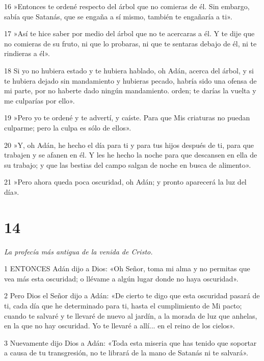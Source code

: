 \par 16 »Entonces te ordené respecto del árbol que no comieras de él. Sin embargo, sabía que Satanás, que se engaña a sí mismo, también te engañaría a ti».

\par 17 »Así te hice saber por medio del árbol que no te acercaras a él. Y te dije que no comieras de su fruto, ni que lo probaras, ni que te sentaras debajo de él, ni te rindieras a él».

\par 18 Si yo no hubiera estado y te hubiera hablado, oh Adán, acerca del árbol, y si te hubiera dejado sin mandamiento y hubieras pecado, habría sido una ofensa de mi parte, por no haberte dado ningún mandamiento. orden; te darías la vuelta y me culparías por ello».

\par 19 »Pero yo te ordené y te advertí, y caíste. Para que Mis criaturas no puedan culparme; pero la culpa es sólo de ellos».

\par 20 »Y, oh Adán, he hecho el día para ti y para tus hijos después de ti, para que trabajen y se afanen en él. Y les he hecho la noche para que descansen en ella de su trabajo; y que las bestias del campo salgan de noche en busca de alimento».

\par 21 »Pero ahora queda poca oscuridad, oh Adán; y pronto aparecerá la luz del día».

\chapter{14}

\par \textit{La profecía más antigua de la venida de Cristo.}

\par 1 ENTONCES Adán dijo a Dios: «Oh Señor, toma mi alma y no permitas que vea más esta oscuridad; o llévame a algún lugar donde no haya oscuridad».

\par 2 Pero Dios el Señor dijo a Adán: «De cierto te digo que esta oscuridad pasará de ti, cada día que he determinado para ti, hasta el cumplimiento de Mi pacto; cuando te salvaré y te llevaré de nuevo al jardín, a la morada de luz que anhelas, en la que no hay oscuridad. Yo te llevaré a allí... en el reino de los cielos».

\par 3 Nuevamente dijo Dios a Adán: «Toda esta miseria que has tenido que soportar a causa de tu transgresión, no te librará de la mano de Satanás ni te salvará».

